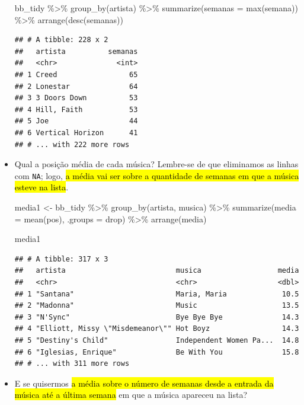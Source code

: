\documentclass[
  11pt]{report}
\newenvironment{Shaded}{\begin{snugshade}}{\end{snugshade}}
\newcommand{\AttributeTok}[1]{\textcolor[rgb]{0.77,0.63,0.00}{#1}}
\newcommand{\FunctionTok}[1]{\textcolor[rgb]{0.00,0.00,0.00}{#1}}
\newcommand{\NormalTok}[1]{#1}
\newcommand{\OtherTok}[1]{\textcolor[rgb]{0.56,0.35,0.01}{#1}}
\newcommand{\SpecialCharTok}[1]{\textcolor[rgb]{0.00,0.00,0.00}{#1}}
\newcommand{\StringTok}[1]{\textcolor[rgb]{0.31,0.60,0.02}{#1}}
\renewenvironment{Shaded}{
    \begin{mdframed}[%
      roundcorner=2pt,%
      innerleftmargin=5pt,%
      innerrightmargin=5pt,%
      topline=true,%
      leftline=true,%
      rightline=true,%
      bottomline=true,%
      linewidth=0.5pt,%
      linecolor=black!20,%
      backgroundcolor=black!2,%
      skipabove=2ex,%
      skipbelow=2.5ex%
    ]%
  }
  {
    \end{mdframed}
  }
\begin{document}
\begin{itemize}
\begin{Shaded}
\begin{Highlighting}[]
\NormalTok{bb\_tidy }\SpecialCharTok{\%\textgreater{}\%} 
  \FunctionTok{group\_by}\NormalTok{(artista) }\SpecialCharTok{\%\textgreater{}\%} 
  \FunctionTok{summarize}\NormalTok{(}\AttributeTok{semanas =} \FunctionTok{max}\NormalTok{(semana)) }\SpecialCharTok{\%\textgreater{}\%} 
  \FunctionTok{arrange}\NormalTok{(}\FunctionTok{desc}\NormalTok{(semanas))}
\end{Highlighting}
\end{Shaded}

\begin{verbatim}
## # A tibble: 228 x 2
##   artista          semanas
##   <chr>              <int>
## 1 Creed                 65
## 2 Lonestar              64
## 3 3 Doors Down          53
## 4 Hill, Faith           53
## 5 Joe                   44
## 6 Vertical Horizon      41
## # ... with 222 more rows
\end{verbatim}
\item
  Qual a posição média de cada música? Lembre-se de que eliminamos as linhas com \texttt{NA}; logo, {\hl{a média vai ser sobre a quantidade de semanas em que a música esteve na lista}}.

\begin{Shaded}
\begin{Highlighting}[]
\NormalTok{media1 }\OtherTok{\textless{}{-}}\NormalTok{ bb\_tidy }\SpecialCharTok{\%\textgreater{}\%} 
  \FunctionTok{group\_by}\NormalTok{(artista, musica) }\SpecialCharTok{\%\textgreater{}\%} 
  \FunctionTok{summarize}\NormalTok{(}\AttributeTok{media =} \FunctionTok{mean}\NormalTok{(pos), }\AttributeTok{.groups =} \StringTok{\textquotesingle{}drop\textquotesingle{}}\NormalTok{) }\SpecialCharTok{\%\textgreater{}\%} 
  \FunctionTok{arrange}\NormalTok{(media)}

\NormalTok{media1}
\end{Highlighting}
\end{Shaded}

\begin{verbatim}
## # A tibble: 317 x 3
##   artista                          musica                  media
##   <chr>                            <chr>                   <dbl>
## 1 "Santana"                        Maria, Maria             10.5
## 2 "Madonna"                        Music                    13.5
## 3 "N'Sync"                         Bye Bye Bye              14.3
## 4 "Elliott, Missy \"Misdemeanor\"" Hot Boyz                 14.3
## 5 "Destiny's Child"                Independent Women Pa...  14.8
## 6 "Iglesias, Enrique"              Be With You              15.8
## # ... with 311 more rows
\end{verbatim}
\item
  E se quisermos {\hl{a média sobre o número de semanas desde a entrada da música até a última semana}} em que a música apareceu na lista?


\end{itemize}
\end{document}
